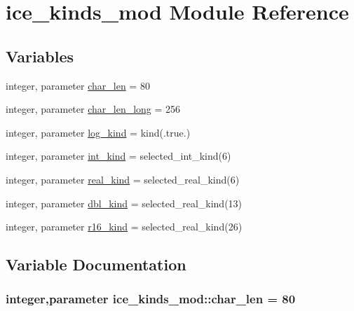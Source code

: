 \hypertarget{namespaceice__kinds__mod}{
\section{ice\_\-kinds\_\-mod Module Reference}
\label{namespaceice__kinds__mod}
}
\subsection*{Variables}
\begin{DoxyCompactItemize}
\item 
integer, parameter \hyperlink{namespaceice__kinds__mod_a7db314add8cff2a5e519342f0468d18d}{char\_\-len} = 80
\item 
integer, parameter \hyperlink{namespaceice__kinds__mod_ac0e6e7d330377449d5a1ad6fa9fc6a31}{char\_\-len\_\-long} = 256
\item 
integer, parameter \hyperlink{namespaceice__kinds__mod_aed396721758f7c268c34a610f26a5feb}{log\_\-kind} = kind(.true.)
\item 
integer, parameter \hyperlink{namespaceice__kinds__mod_aeda5fd1eefedcb096b1929d3c2ed46c8}{int\_\-kind} = selected\_\-int\_\-kind(6)
\item 
integer, parameter \hyperlink{namespaceice__kinds__mod_a66f2774e6096156e4fe5914003097c72}{real\_\-kind} = selected\_\-real\_\-kind(6)
\item 
integer, parameter \hyperlink{namespaceice__kinds__mod_af54ee31a38380cc4f477ba152ffef7d5}{dbl\_\-kind} = selected\_\-real\_\-kind(13)
\item 
integer, parameter \hyperlink{namespaceice__kinds__mod_ad334fc097ec7edf7543cd71a265c4680}{r16\_\-kind} = selected\_\-real\_\-kind(26)
\end{DoxyCompactItemize}


\subsection{Variable Documentation}
\hypertarget{namespaceice__kinds__mod_a7db314add8cff2a5e519342f0468d18d}{
\subsubsection[{char\_\-len}]{\setlength{\rightskip}{0pt plus 5cm}integer,parameter {\bf ice\_\-kinds\_\-mod::char\_\-len} = 80}}
\label{namespaceice__kinds__mod_a7db314add8cff2a5e519342f0468d18d}


